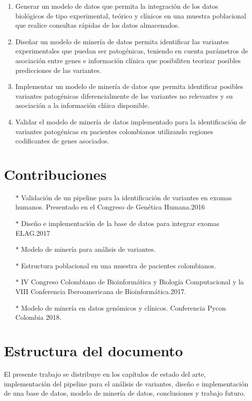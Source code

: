\begin{enumerate}
	\item Generar un modelo de datos que permita la integraci\'on de los datos biol\'ogicos de tipo experimental, te\'orico y cl\'inicos en una  muestra poblacional que realice consultas r\'apidas de los datos almacenados.
	\item Dise\~nar un modelo de miner\'ia de datos permita identificar las variantes experimentales que puedan ser patog\'enicas, teniendo en cuenta par\'ametros de asociaci\'on entre genes e informaci\'on cl\'inica que posibiliten teorizar posibles predicciones de las variantes. 
	\item Implementar un  modelo de miner\'ia de datos que permita identificar posibles variantes patog\'enicas diferencialmente de las variantes no relevantes y  su asociaci\'on a la informaci\'on cl\'nica disponible.
	\item Validar el modelo de miner\'ia de datos implementado para la identificaci\'on de variantes patog\'enicas en pacientes colombianos utilizando regiones codificantes de genes asociados.  
\end{enumerate}

\section*{Contribuciones}

\begin{itemize}
	\item[$*$] Validación de un pipeline para la identificación de variantes en exomas humanos. Presentado en el Congreso de Genética Humana.2016
	\item[$*$] Diseño e implementación de la base de datos para integrar exomas ELAG.2017
	\item[$*$] Modelo de minería para análisis de variantes.
	\item[$*$] Estructura poblacional en una muestra de pacientes colombianos.
	\item[$*$] IV Congreso Colombiano de Bioinformática y Biología Computacional y la VIII Conferencia Iberoamericana de Bioinformática.2017.
	\item[$*$] Modelo de minería en datos genómicos y clínicos. Conferencia Pycon Colombia 2018. 
\end{itemize}

\section*{Estructura del documento}

El presente trabajo se distribuye en los capítulos de estado del arte, implementación del pipeline para el análisis de variantes, diseño e implementación de una base de datos, modelo de minería de datos, conclusiones y trabajo futuro.

